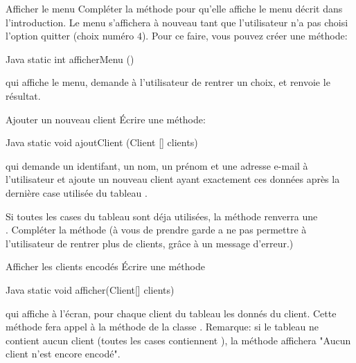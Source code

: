\documentclass[a4paper,11pt]{article}
\begin{document}
 \begin{Exercice}{Afficher le menu}
 	    Compl\'eter la m\'ethode  pour qu'elle affiche le menu d\'ecrit dans l'introduction. Le menu s'affichera \`a nouveau tant que l'utilisateur n'a pas choisi l'option quitter (choix num\'ero $4$). Pour ce faire, vous pouvez cr\'eer une m\'ethode:
	    
     \begin{Code}{Java}
		   static int afficherMenu ()
     \end{Code}	    		
qui affiche le menu, demande \`a l'utilisateur de rentrer un choix, et renvoie le r\'esultat.
		
  \end{Exercice}
  
   \begin{Exercice}{Ajouter un nouveau client}
   	 		\'Ecrire une m\'ethode:
		\begin{Code}{Java}
		    static void ajoutClient (Client [] clients)
		\end{Code}
qui demande un identifant, un nom, un pr\'enom et une adresse e-mail \`a l'utilisateur et ajoute un nouveau client ayant exactement ces données apr\`es la derni\`ere case utilis\'ee du tableau .

Si toutes les cases du tableau sont d\'eja utilis\'ees, la m\'ethode renverra une \\. Compl\'eter la m\'ethode  (\`a vous de prendre garde a ne pas permettre \`a l'utilisateur de rentrer plus de  clients, grâce à un message d'erreur.)
				
\end{Exercice}
  
  	\begin{Exercice}{Afficher les clients encod\'es}
	\'Ecrire une m\'ethode
	
		\begin{Code}{Java}
		    static void afficher(Client[] clients)
		\end{Code}
	qui affiche \`a l'\'ecran, pour chaque client du tableau  les donn\'es du client. Cette m\'ethode fera appel \`a la m\'ethode  de la classe . Remarque: si le tableau ne contient aucun client (toutes les cases contiennent ), la m\'ethode affichera "Aucun client n'est encore encod\'e".
		
	\end{Exercice}
	
\end{document}
